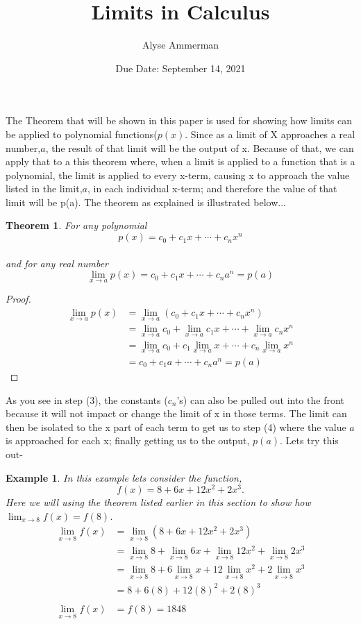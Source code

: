 \documentclass[10pt]{article}
\title{Limits in Calculus}
\author{Alyse Ammerman}
\date{Due Date: September 14, 2021}
\newtheorem{thm}{Theorem}[section]
\newtheorem{expl}{Example}[section]
\begin{document}
\maketitle
\newpage
The Theorem that will be shown in this paper is used for showing how limits can be applied to polynomial functions(\(p(x)\). Since as a limit of X approaches a real number,\(a\), the result of that limit will be the output of x. Because of that, we can apply that to a this theorem where, when a limit is applied to a function that is a polynomial, the limit is applied to every x-term, causing x to approach the value listed in the limit,\(a\), in each individual x-term; and therefore the value of that limit will be p(a).
The theorem as explained is illustrated below...
\begin{thm}
    For any polynomial \[p(x)=c_0+c_1x+\cdots+c_nx^n\]\\ and for any real number \[\lim_{x\to a}p(x)=c_0+c_1x+\cdots+c_{n}a^n=p(a)\]
    \end{thm}
\begin{proof}
    \begin{align}
    \lim_{x\to a}p(x) &= \lim_{x\to a} (c_0 + c_{1}x +\cdots+c_{n}x^n)\\
    &=\lim_{x\to a}c_0+\lim_{x\to a}c_{1}x+\cdots+\lim_{x\to a}c_{n}x^n\\
    &=\lim_{x\to a}c_0+c_{1}\lim_{x\to a}x+\cdots+c_{n}\lim_{x\to a}x^{n}\\
    &=c_0+c_{1}a+\cdots+c_{n}a^n= p(a)
    \end{align}
\end{proof}
As you see in step (3), the constants (\(c_n\)'s) can also be pulled out into the front because it will not impact or change the limit of x in those terms. The limit can then be isolated to the x part of each term to get us to step (4) where the value \(a\) is approached for each x; finally getting us to the output, \(p(a)\).
\newpage
Lets try this out-
\begin{expl} 
In this example lets consider the function, \[f(x)=8+6x+12x^2+2x^3.\] Here we will using the theorem listed earlier in this section to show how \(\lim_{x\to 8}f(x)= f(8)\).
    \begin{align*}\lim_{x\to 8}f(x) &= \lim_{x\to 8} (8+6x+12x^2+2x^3)\\
    &=\lim_{x\to 8}8+\lim_{x\to 8}6x+\lim_{x\to 8}12x^2+\lim_{x\to 8}2x^3\\
    &=\lim_{x\to 8}8+6\lim_{x\to 8}x+12\lim_{x\to 8}x^2+2\lim_{x\to 8}x^3\\
    &=8+6(8)+12(8)^2+2(8)^3\\\\
    \lim_{x\to 8}f(x)&=f(8)=1848
    \end{align*}
\end{expl}
\end{document}
